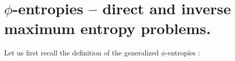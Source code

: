 \documentclass[english,sort&compress]{elsarticle}
\theoremstyle{definition}
\theoremstyle{plain}
\theoremstyle{plain}
\newcommand{\Esp}[1]{\mathbb{E}\left[ #1 \right]}
\begin{document}



\section{$\phi$-entropies -- direct and inverse maximum entropy problems.}
\label{sec:MaxPhiEnt}

Let  us  first  recall   the  definition  of  the  generalized  $\phi$-entropies
:
\end{document}
